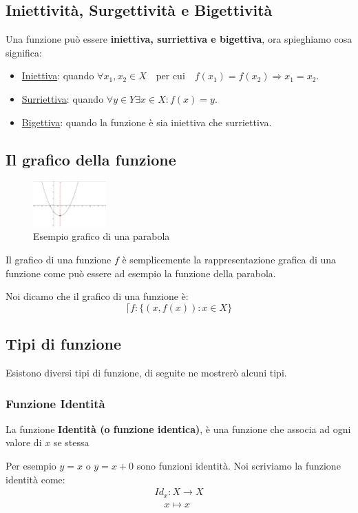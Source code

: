 \documentclass{article}
\theoremstyle{definition}
\begin{document}
\subsection{Iniettività, Surgettività e Bigettività}\label{sec:iniettiva_surriettiva_bigettiva}
Una funzione può essere \textbf{iniettiva, surriettiva e bigettiva}, ora spieghiamo cosa significa:
\begin{itemize}
        \item \underline{Iniettiva}: quando $ \forall x_1,x_2 \in X \quad \mbox{per cui} \quad f(x_1)=f(x_2) \Rightarrow x_1=x_2  $.   
        \item \underline{Surriettiva}: quando $ \forall y \in Y  \exists x \in X : f(x) = y $.   
        \item \underline{Bigettiva}: quando la funzione è sia iniettiva che surriettiva.  
\end{itemize}



\subsection{Il grafico della funzione}

\begin{figure}[!h]
\centering
        \includegraphics[width=0.25\textwidth]{esempio_grafico_funzione.jpg}
        \caption{Esempio grafico di una parabola}\label{fig:esempio_grafico_funzione}
\end{figure}


Il grafico di una funzione $f$ è semplicemente la rappresentazione grafica di una funzione come può essere ad esempio la funzione della parabola.

Noi dicamo che il grafico di una funzione è:
\begin{equation*}
        \lceil f : \{(x, f(x)) : x \in X\} 
\end{equation*}



\subsection{Tipi di funzione} 
Esistono diversi tipi di funzione, di seguite ne mostrerò alcuni tipi.


\subsubsection{Funzione Identità}
La funzione \textbf{Identità (o funzione identica)}, è una funzione che associa ad ogni valore di $ x $ se stessa \par
Per esempio $ y=x $ o $ y = x + 0 $ sono funzioni identità. \newline
Noi scriviamo la funzione identità come:
\begin{align*}
        Id_x : X \to X \\
        \quad x \mapsto x
\end{align*}
\end{document}
